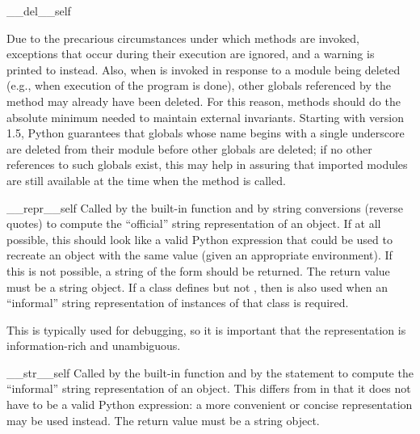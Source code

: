 \begin{methoddesc}[object]{__del__}{self}
\begin{notice}[warning]
Due to the precarious circumstances under which
 methods are invoked, exceptions that occur during their
execution are ignored, and a warning is printed to 
instead.  Also, when  is invoked in response to a module
being deleted (e.g., when execution of the program is done), other
globals referenced by the  method may already have been
deleted.  For this reason,  methods should do the
absolute minimum needed to maintain external invariants.  Starting with
version 1.5, Python guarantees that globals whose name begins with a single
underscore are deleted from their module before other globals are deleted;
if no other references to such globals exist, this may help in assuring that
imported modules are still available at the time when the
 method is called.
\end{notice}
\end{methoddesc}

\begin{methoddesc}[object]{__repr__}{self}
Called by the  built-in function
and by string conversions (reverse quotes) to compute the ``official''
string representation of an object.  If at all possible, this should
look like a valid Python expression that could be used to recreate an
object with the same value (given an appropriate environment).  If
this is not possible, a string of the form  should be returned.  The return value must be a
string object.
If a class defines  but not ,
then  is also used when an ``informal'' string
representation of instances of that class is required.		     

This is typically used for debugging, so it is important that the
representation is information-rich and unambiguous.
\end{methoddesc}

\begin{methoddesc}[object]{__str__}{self}
Called by the  built-in function and
by the  statement to compute the
``informal'' string representation of an object.  This differs from
 in that it does not have to be a valid Python
expression: a more convenient or concise representation may be used
instead.  The return value must be a string object.
\end{methoddesc}

